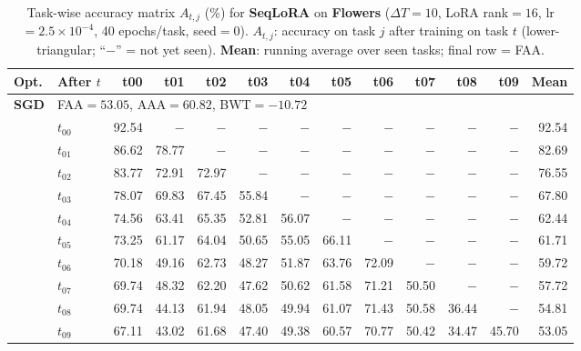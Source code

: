 
\begin{table}[ht]
\centering
\caption{%
  Task-wise accuracy matrix $A_{t,j}$ (\%) for \textbf{SeqLoRA} on \textbf{Flowers} ($\Delta T=10$, LoRA rank$=16$, lr$=2.5\times10^{-4}$, 40 epochs/task, seed$=0$).
  $A_{t,j}$: accuracy on task $j$ after training on task $t$  (lower-triangular; ``$-$'' = not yet seen).
  \textbf{Mean}: running average over seen tasks; final row = FAA.
}
\label{tab:raw_seqlora_flowers}
\setlength{\tabcolsep}{2.8pt}
\renewcommand{\arraystretch}{0.88}
\scriptsize
\begin{tabular}{@{}l l r r r r r r r r r r r@{}}
\toprule
\textbf{Opt.} & \textbf{After $t$} & \textbf{t00} & \textbf{t01} & \textbf{t02} & \textbf{t03} & \textbf{t04} & \textbf{t05} & \textbf{t06} & \textbf{t07} & \textbf{t08} & \textbf{t09} & \textbf{Mean} \\
\midrule
\multirow{11}{*}{\textbf{SGD}} & \multicolumn{12}{l}{\quad\small FAA$=53.05$,\; AAA$=60.82$,\; BWT$=-10.72$} \\
 & $t_{00}$ & 92.54 & $-$ & $-$ & $-$ & $-$ & $-$ & $-$ & $-$ & $-$ & $-$ & 92.54 \\
 & $t_{01}$ & 86.62 & 78.77 & $-$ & $-$ & $-$ & $-$ & $-$ & $-$ & $-$ & $-$ & 82.69 \\
 & $t_{02}$ & 83.77 & 72.91 & 72.97 & $-$ & $-$ & $-$ & $-$ & $-$ & $-$ & $-$ & 76.55 \\
 & $t_{03}$ & 78.07 & 69.83 & 67.45 & 55.84 & $-$ & $-$ & $-$ & $-$ & $-$ & $-$ & 67.80 \\
 & $t_{04}$ & 74.56 & 63.41 & 65.35 & 52.81 & 56.07 & $-$ & $-$ & $-$ & $-$ & $-$ & 62.44 \\
 & $t_{05}$ & 73.25 & 61.17 & 64.04 & 50.65 & 55.05 & 66.11 & $-$ & $-$ & $-$ & $-$ & 61.71 \\
 & $t_{06}$ & 70.18 & 49.16 & 62.73 & 48.27 & 51.87 & 63.76 & 72.09 & $-$ & $-$ & $-$ & 59.72 \\
 & $t_{07}$ & 69.74 & 48.32 & 62.20 & 47.62 & 50.62 & 61.58 & 71.21 & 50.50 & $-$ & $-$ & 57.72 \\
 & $t_{08}$ & 69.74 & 44.13 & 61.94 & 48.05 & 49.94 & 61.07 & 71.43 & 50.58 & 36.44 & $-$ & 54.81 \\
 & $t_{09}$ & 67.11 & 43.02 & 61.68 & 47.40 & 49.38 & 60.57 & 70.77 & 50.42 & 34.47 & 45.70 & 53.05 \\
\midrule

\end{tabular}
\end{table}

